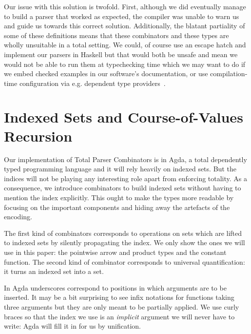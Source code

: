 Our issue with this solution is twofold. First, although we did
eventually manage to build a parser that worked as expected,
the compiler was unable to warn us and guide us towards this
correct solution. Additionally, the blatant partiality of
some of these definitions means that these combinators and
these types are wholly unsuitable in a total setting. We could, of
course use an escape hatch and implement our parsers in Haskell
but that would both be unsafe and mean we would not be able
to run them at typechecking time which we may want to do if
we embed checked examples in our software's documentation,
or use compilation-time configuration via e.g. dependent type
providers~\cite{christiansen2013dependent}.

\section{Indexed Sets and Course-of-Values Recursion}

Our implementation of Total Parser Combinators is in Agda,
a total dependently typed programming language and it will
rely heavily on indexed sets. But the indices will not be
playing any interesting role apart from enforcing totality.
As a consequence, we introduce combinators to build indexed
sets without having to mention the index explicitly. This
ought to make the types more readable by focusing on the
important components and hiding away the artefacts of the
encoding.

The first kind of combinators corresponds to operations on
sets which are lifted to indexed sets by silently propagating
the index. We only show the ones we will use in this paper:
the pointwise arrow and product types and the constant function.
The second kind of combinator corresponds to universal quantification:
it turns an indexed set into a set.

\begin{minipage}{0.55\textwidth}
\end{minipage}
\begin{minipage}{0.30\textwidth}
\end{minipage}

 In Agda underscores correspond to
positions in which arguments are to be inserted. It may be a
bit surprising to see infix notations for functions taking
three arguments but they are only meant to be partially applied.
 We use curly braces so that the
index we use is an \emph{implicit} argument we will never
have to write: Agda will fill it in for us by unification.
\medskip{}

